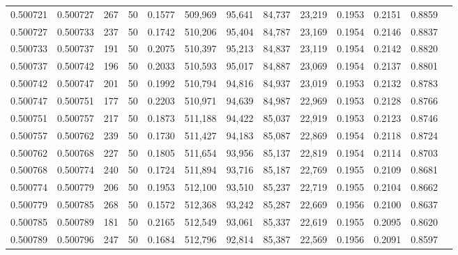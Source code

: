 \begin{tabular}{rrrrrrrrrrrrr}
0.500721 & 0.500727 & 267 &  50 &                                     0.1577 & 509,969 &  95,641 &  84,737 &  23,219 & 0.1953 & 0.2151 & 0.8859 \\
0.500727 & 0.500733 & 237 &  50 &                                     0.1742 & 510,206 &  95,404 &  84,787 &  23,169 & 0.1954 & 0.2146 & 0.8837 \\
0.500733 & 0.500737 & 191 &  50 &                                     0.2075 & 510,397 &  95,213 &  84,837 &  23,119 & 0.1954 & 0.2142 & 0.8820 \\
0.500737 & 0.500742 & 196 &  50 &                                     0.2033 & 510,593 &  95,017 &  84,887 &  23,069 & 0.1954 & 0.2137 & 0.8801 \\
0.500742 & 0.500747 & 201 &  50 &                                     0.1992 & 510,794 &  94,816 &  84,937 &  23,019 & 0.1953 & 0.2132 & 0.8783 \\
0.500747 & 0.500751 & 177 &  50 &                                     0.2203 & 510,971 &  94,639 &  84,987 &  22,969 & 0.1953 & 0.2128 & 0.8766 \\
0.500751 & 0.500757 & 217 &  50 &                                     0.1873 & 511,188 &  94,422 &  85,037 &  22,919 & 0.1953 & 0.2123 & 0.8746 \\
0.500757 & 0.500762 & 239 &  50 &                                     0.1730 & 511,427 &  94,183 &  85,087 &  22,869 & 0.1954 & 0.2118 & 0.8724 \\
0.500762 & 0.500768 & 227 &  50 &                                     0.1805 & 511,654 &  93,956 &  85,137 &  22,819 & 0.1954 & 0.2114 & 0.8703 \\
0.500768 & 0.500774 & 240 &  50 &                                     0.1724 & 511,894 &  93,716 &  85,187 &  22,769 & 0.1955 & 0.2109 & 0.8681 \\
0.500774 & 0.500779 & 206 &  50 &                                     0.1953 & 512,100 &  93,510 &  85,237 &  22,719 & 0.1955 & 0.2104 & 0.8662 \\
0.500779 & 0.500785 & 268 &  50 &                                     0.1572 & 512,368 &  93,242 &  85,287 &  22,669 & 0.1956 & 0.2100 & 0.8637 \\
0.500785 & 0.500789 & 181 &  50 &                                     0.2165 & 512,549 &  93,061 &  85,337 &  22,619 & 0.1955 & 0.2095 & 0.8620 \\
0.500789 & 0.500796 & 247 &  50 &                                     0.1684 & 512,796 &  92,814 &  85,387 &  22,569 & 0.1956 & 0.2091 & 0.8597 \\

\end{tabular}
